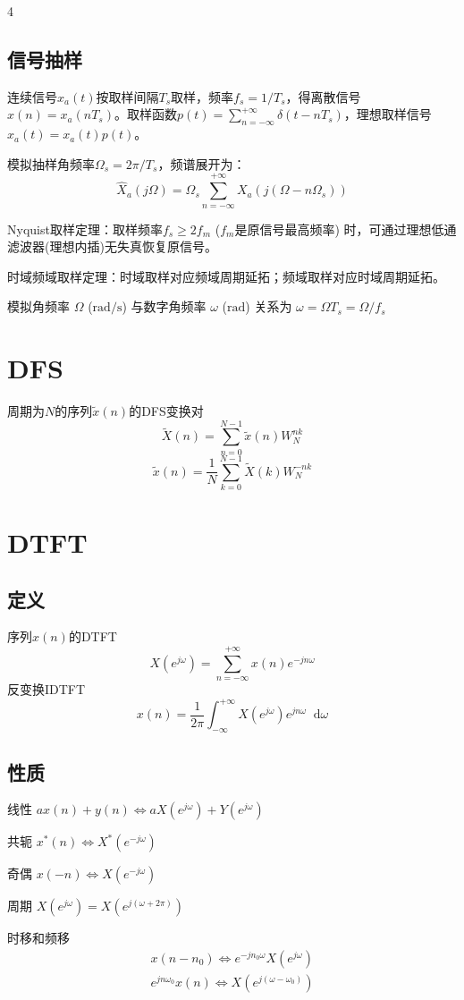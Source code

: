 \documentclass[8pt, a4paper]{extarticle}
\newcommand*{\dif}{\mathop{}\!\mathrm{d}}
\begin{document}
\begin{multicols}{4}
\subsection{信号抽样}
连续信号\(x_a(t)\)按取样间隔\(T_s\)取样，频率\(f_s=1/T_s\)，得离散信号\(x(n)=x_a(nT_s)\)。取样函数\(p(t)=\sum_{n=-\infty}^{+\infty}\delta(t-nT_s)\)，理想取样信号\(\hat{x}_a(t)=x_a(t)p(t)\)。

模拟抽样角频率\(\Omega_s=2\pi/T_s\)，频谱展开为：
\[ \hat{X}_a(j\Omega)=\Omega_s\sum_{n=-\infty}^{+\infty}X_a(j(\Omega-n\Omega_s)) \]

Nyquist取样定理：取样频率\(f_s \geq 2f_m\) (\(f_m\)是原信号最高频率) 时，可通过理想低通滤波器(理想内插)无失真恢复原信号。

时域频域取样定理：时域取样对应频域周期延拓；频域取样对应时域周期延拓。

模拟角频率 \(\Omega\) (\(\mathrm{rad/s}\)) 与数字角频率 \(\omega\) (\(\mathrm{rad}\)) 关系为 \(\omega = \Omega T_s = \Omega/f_s\)

\section{DFS}
周期为\(N\)的序列\(\tilde{x}(n)\)的DFS变换对
\[
\tilde{X}(n)=\sum_{n=0}^{N-1}\tilde{x}(n)W_N^{nk}
\]
\[
\tilde{x}(n)=\frac{1}{N}\sum_{k=0}^{N-1}\tilde{X}(k)W_N^{-nk}
\]

\section{DTFT}
\subsection{定义}
序列\(x(n)\)的DTFT
\[
X(e^{j\omega}) = \sum_{n=-\infty}^{+\infty}x(n)e^{-jn\omega}
\]
反变换IDTFT
\[
x(n) = \frac{1}{2\pi}\int_{-\infty}^{+\infty}X(e^{j\omega})e^{jn\omega}\dif \omega
\]
\subsection{性质}
线性
\(ax(n)+y(n)\Leftrightarrow aX(e^{j\omega}) + Y(e^{j\omega})\)

共轭
\(x^*(n)\Leftrightarrow X^*(e^{-j\omega})\)

奇偶
\(x(-n)\Leftrightarrow X(e^{-j\omega})\)

周期
\(X(e^{j\omega})=X(e^{j(\omega+2\pi)})\)

时移和频移
\begin{gather*}
x(n-n_0)\Leftrightarrow e^{-jn_0\omega}X(e^{j\omega})\\
e^{jn\omega_0}x(n)\Leftrightarrow X(e^{j(\omega-\omega_0)})
\end{gather*}


\end{multicols}
\end{document}
